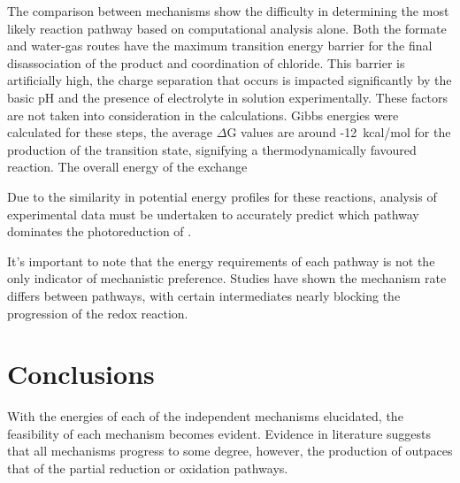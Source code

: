 The comparison between mechanisms show the difficulty in determining the most likely reaction pathway based on computational analysis alone. Both the formate and water-gas routes have the maximum transition energy barrier for the final disassociation of the product and coordination of chloride. This barrier is artificially high, the charge separation that occurs is impacted significantly by the basic pH and the presence of electrolyte in solution experimentally. These factors are not taken into consideration in the calculations. Gibbs energies were calculated for these steps, the average $\Delta$G values are around -12~kcal/mol for the production of the transition state, signifying a thermodynamically favoured reaction. The overall energy of the exchange 

Due to the similarity in potential energy profiles for these reactions, analysis of experimental data must be undertaken to accurately predict which pathway dominates the photoreduction of . 

It's important to note that the energy requirements of each pathway is not the only indicator of mechanistic preference. Studies have shown the mechanism rate differs between pathways, with certain intermediates nearly blocking the progression of the redox reaction.

\section{Conclusions} 

With the energies of each of the independent mechanisms elucidated, the feasibility of each mechanism becomes evident. Evidence in literature suggests that all mechanisms progress to some degree, however, the production of  outpaces that of the partial reduction or oxidation pathways. 
